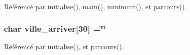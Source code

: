 Référencé par initialise(), main(), minimum(), et parcours().

\subsubsection[{ville\+\_\+arriver}]{\setlength{\rightskip}{0pt plus 5cm}char ville\+\_\+arriver[30] =\char`\"{}\char`\"{}}\label{dijkstra__malloc_8h_a334549312e621ef35e24e7dfe57a23d4}


Référencé par initialise(), et parcours().

